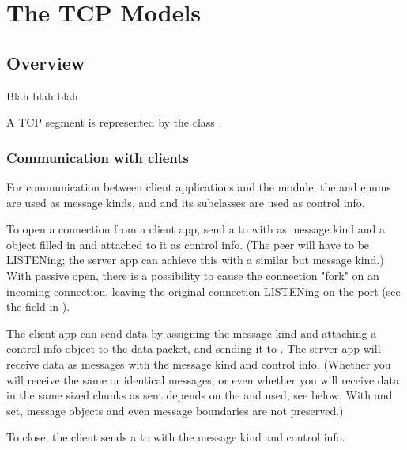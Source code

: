 \chapter{The TCP Models}
\label{cha:tcp}


\section{Overview}

Blah blah blah

A TCP segment is represented by the class .

\subsection{Communication with clients}

For communication between client applications and the  module,
the  and  enums are used as message kinds,
and  and its subclasses are used as control info.

To open a connection from a client app, send a  to  with
 as message kind and a  object filled in
and attached to it as control info. (The peer  will have to be LISTENing;
the server app can achieve this with a similar  but 
message kind.) With passive open, there is a possibility to cause the connection
"fork" on an incoming connection, leaving the original connection LISTENing
on the port (see the  field in ).

The client app can send data by assigning the  message kind
and attaching a  control info object to the data packet,
and sending it to . The server app will receive data as messages
with the  message kind and  control info.
(Whether you will receive the same or identical messages, or even whether
you will receive data in the same sized chunks as sent depends on the
 and  used, see below. With
 and  set, message objects
and even message boundaries are not preserved.)

To close, the client sends a  to  with the  message kind
and  control info.

